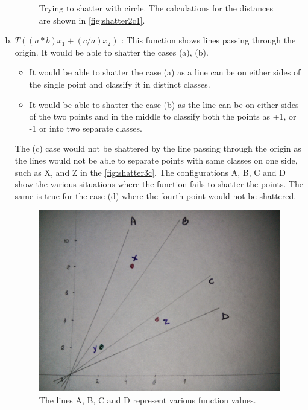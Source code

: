 \documentclass[a4paper, 11pt]{article}
\begin{document}
\begin{enumerate}[(a)]
\begin{figure}
{}
\caption[Scatter]{Trying to shatter with circle. The calculations for the distances are shown in \autoref{fig:shatter2c1}.}
\label{fig:shatter2c}
\end{figure}

\item \(T((a * b)x_1 + (c/a)x_2)\) : This function shows lines passing through the origin. It would be able to shatter the cases (a), (b). 
\begin{itemize}
\item It would be able to shatter the case (a) as a line can be on either sides of the single point and classify it in distinct classes.
\item It would be able to shatter the case (b) as the line can be on either sides of the two points and in the middle to classify both the points as +1, or -1 or into two separate classes.
\end{itemize}
The (c) case would not be shattered by the line passing through the origin as the lines would not be able to separate points with same classes on one side, such as X, and Z in the \autoref{fig:shatter3c}. The configurations A, B, C and D show the various situations where the function fails to shatter the points. The same is true for the case (d) where the fourth point would not be shattered.
\begin{figure}
\centering
\includegraphics[scale=0.20]{shatter4.jpg}
\caption[]{The lines A, B, C and D represent various function values.}
\label{fig:shatter3c}
\end{figure}
\end{enumerate}
\end{document}
